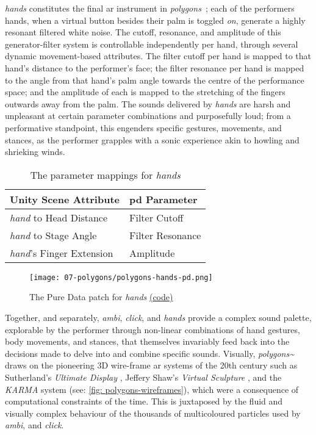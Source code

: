 \textit{hands} constitutes the final \gls{ar} instrument in \textit{polygons~}; each of the performers hands, when a virtual button besides their palm is toggled \textit{on}, generate a highly resonant filtered white noise. The cutoff, resonance, and amplitude of this generator-filter system is controllable independently per hand, through several dynamic movement-based attributes. The filter cutoff per hand is mapped to that hand's distance to the performer's face; the filter resonance per hand is mapped to the angle from that hand's palm angle towards the centre of the performance space; and the amplitude of each is mapped to the stretching of the fingers outwards away from the palm. The sounds delivered by \textit{hands} are harsh and unpleasant at certain parameter combinations and purposefully loud; from a performative standpoint, this engenders specific gestures, movements, and stances, as the performer grapples with a sonic experience akin to howling and shrieking winds.
\begin{table}
    \centering
    \begin{tabular}{ l|l }
        \textbf{Unity Scene Attribute}         & \textbf{\gls{pd} Parameter}    \\
        \hline      
        \textit{hand} to Head Distance         & Filter Cutoff                  \\
        \textit{hand} to Stage Angle           & Filter Resonance               \\
        \textit{hand}'s Finger Extension       & Amplitude               
    \end{tabular}
    \caption{The parameter mappings for \textit{hands}}
    \label{fig: polygons-hands-mapping}
\end{table}
\begin{figure}
    \centering
    \texttt{[image: 07-polygons/polygons-hands-pd.png]}
    \caption{The Pure Data patch for \textit{hands} \href{https://github.com/sambilbow/polygons/tree/main/unity/Assets/StreamingAssets/PdAssets/hands}{(code)}}
    \label{fig: polygons-hands-pd}
\end{figure}

Together, and separately, \textit{ambi}, \textit{click}, and \textit{hands} provide a complex sound palette, explorable by the performer through non-linear combinations of hand gestures, body movements, and stances, that themselves invariably feed back into the decisions made to delve into and combine specific sounds. Visually, \textit{polygons\textasciitilde{}} draws on the pioneering 3D wire-frame \gls{ar} systems of the 20th century such as Sutherland's \textit{Ultimate Display} \citeyearpar{sutherland1968}, Jeffery Shaw's \textit{Virtual Sculpture} \citeyearpar{shaw1981}, and the \textit{KARMA} system \citep{feiner1993} (see: \autoref{fig: polygons-wireframes}), which were a consequence of computational constraints of the time. This is juxtaposed by the fluid and visually complex behaviour of the thousands of multicoloured particles used by \textit{ambi}, and \textit{click}.

